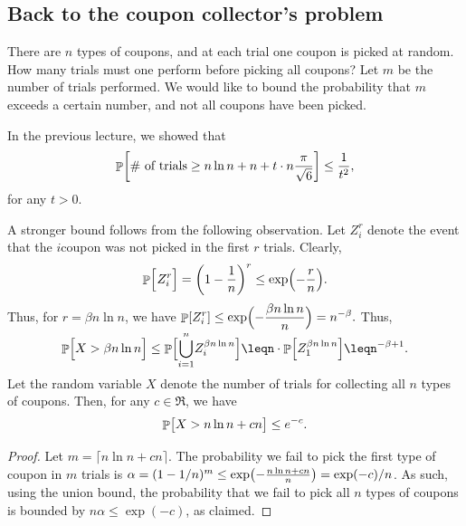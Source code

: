 \subsection{Back to the coupon collector's problem}

There are $n$ types of coupons, and at each trial one coupon is picked
at random. How many trials must one perform before picking all
coupons? Let $m$ be the number of trials performed. We would like to
bound the probability that $m$ exceeds a certain number, and not all
coupons have been picked.

In the previous lecture, we showed that
\begin{equation*}
    \Prob{ \text{\# of trials} \geq n \ln n + n + t \cdot n
       \frac{\pi}{\sqrt{6}} } \leq \frac{1}{t^2},    
\end{equation*}
for any $t > 0$.

A stronger bound follows from the following observation. Let
$Z_i^{r}$ denote the event that the $i$\th coupon was not picked in
the first $r$ trials. Clearly,
\begin{equation*}
    \Prob{\Bigl.\ts Z_i^r}%
    =%
    \pth[]{ 1-\frac{1}{n}}^{r}%
    \leq%
    \exp\pth{-\frac{r}{n}}.    
\end{equation*}
Thus, for $r= \beta n \ln{n}$, we have
\begin{math}
    \ds%
    \Prob{ Z_i^{r}}%
    \leq%
    \exp \Bigl( -\frac{\beta n \ln{n}}{n}\Bigr)%
    =%
    n^{-\beta}.
\end{math}
Thus,
\begin{equation*}
    \Prob{\Big. X > \beta n \ln{n}}%
    \leq%
    \Prob{\smash{ \bigcup_{i=1}^n} Z_i^{\beta n \ln{n}} }%
    \leq%
    n \cdot \Prob{\bigl. Z_1^{\beta n \ln n}}%
    \leq%
    n^{-\beta + 1}.    
\end{equation*}


\begin{lemma}
    Let the random variable $X$ denote the number of trials for
    collecting all $n$ types of coupons. Then, for any $c \in \Re$, we have
    \begin{equation*}
        \Prob{\bigl. X > n \ln n + c n } \leq e^{-c}.
    \end{equation*}
\end{lemma}
\begin{proof}
    Let $m = \lceil n \ln n + c n \rceil$.
    The probability we fail to pick the first type of coupon in $m$ trials is
    $\alpha = (1-1/n)^m \leq \exp\pth{ - \frac{n \ln n + c n}{n} } =
    \exp( - c) /n$. As such, using the union bound, the probability that we
    fail to pick all $n$ types of coupons is bounded by $n \alpha \leq
    \exp(-c)$, as claimed.
\end{proof}

